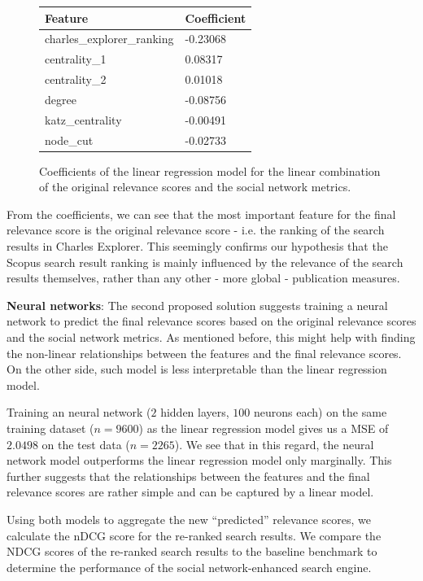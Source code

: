 \begin{figure}[!ht]
    \captionsetup{width=.9\linewidth}
    \centering
    \begin{tabular}{|l|l|}
    \hline
        \textbf{Feature} & \textbf{Coefficient} \\ \hline
        charles\_explorer\_ranking & -0.23068 \\ \hline
        centrality\_1 & 0.08317 \\ \hline
        centrality\_2 & 0.01018 \\ \hline
        degree & -0.08756 \\ \hline
        katz\_centrality & -0.00491 \\ \hline
        node\_cut & -0.02733 \\ \hline
    \end{tabular}
    \caption{Coefficients of the linear regression model for the linear combination of the original relevance scores and the social network metrics.}
\end{figure}

From the coefficients, we can see that the most important feature for the final relevance score is the original relevance score - i.e. the ranking of the search results in Charles Explorer.
This seemingly confirms our hypothesis that the Scopus search result ranking is mainly influenced by the relevance of the search results themselves, rather than any other - more global - publication measures.

\textbf{Neural networks}: The second proposed solution suggests training a neural network to predict the final relevance scores based on the original relevance scores and the social network metrics.
As mentioned before, this might help with finding the non-linear relationships between the features and the final relevance scores.
On the other side, such model is less interpretable than the linear regression model.

Training an neural network ($2$ hidden layers, $100$ neurons each) on the same training dataset ($n=9600$) as the linear regression model gives us a \ac{MSE} of $2.0498$ on the test data ($n=2265$).
We see that in this regard, the neural network model outperforms the linear regression model only marginally.
This further suggests that the relationships between the features and the final relevance scores are rather simple and can be captured by a linear model.

Using both models to aggregate the new ``predicted'' relevance scores, we calculate the nDCG score for the re-ranked search results.
We compare the NDCG scores of the re-ranked search results to the baseline benchmark to determine the performance of the social network-enhanced search engine.

